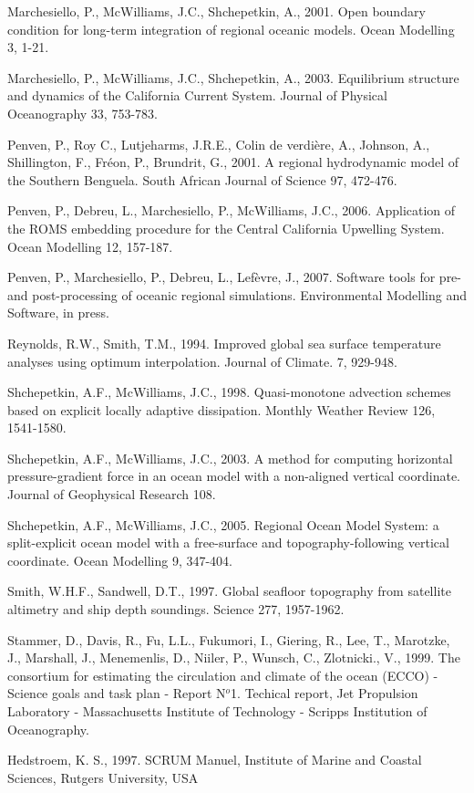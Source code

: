 Marchesiello, P., McWilliams, J.C., Shchepetkin, A.,
2001.
Open boundary condition for long-term integration of regional oceanic
models.
Ocean Modelling
3,
1-21.

Marchesiello, P., McWilliams, J.C., Shchepetkin, A.,
2003.
Equilibrium structure and dynamics of the California Current System.
Journal of Physical Oceanography
33,
753-783.

Penven, P., Roy C., Lutjeharms, J.R.E., 
Colin de verdi\`ere, A., Johnson, A., Shillington, F.,
Fr\'eon, P., Brundrit, G.,
2001.
A regional hydrodynamic model of the Southern Benguela.
South African Journal of Science
97,
472-476.

Penven, P., Debreu, L., Marchesiello,  P., McWilliams, J.C.,
2006.
Application of the ROMS embedding procedure for the Central 
California Upwelling System.
Ocean Modelling
12, 157-187.

Penven, P., Marchesiello, P., Debreu, L., Lef\`evre, J.,
2007.
Software tools for pre- and post-processing of oceanic regional 
simulations.
Environmental Modelling and Software,
in press.

Reynolds, R.W., Smith, T.M., 1994. 
Improved global sea surface temperature
analyses using optimum interpolation. 
Journal of Climate.
7, 929-948.

Shchepetkin, A.F., McWilliams, J.C.,
1998.
Quasi-monotone advection schemes based on explicit locally
adaptive dissipation.
Monthly Weather Review
126,
1541-1580.

Shchepetkin, A.F., McWilliams, J.C.,
2003.
A method for computing horizontal pressure-gradient force
in an ocean model with a non-aligned vertical coordinate.
Journal of Geophysical Research
108.

Shchepetkin, A.F., McWilliams, J.C.,
2005.
Regional Ocean Model System: a split-explicit ocean model with a
free-surface and topography-following vertical coordinate.
Ocean Modelling
9, 347-404.

Smith, W.H.F., Sandwell, D.T.,
1997.
Global seafloor topography from satellite altimetry and ship depth soundings.
Science
277,
1957-1962.

Stammer, D., Davis, R., Fu, L.L., Fukumori, I., Giering, R., Lee, T.,
Marotzke, J., Marshall, J., Menemenlis, D., Niiler, P., Wunsch, C.,
Zlotnicki., V., 1999. 
The consortium for estimating the circulation and
climate of the ocean ({ECCO}) - {Science goals} and task plan - {Report
N$^o$1}. 
Techical report, 
Jet Propulsion Laboratory - Massachusetts Institute of
 Technology - Scripps Institution of Oceanography.

Hedstroem, K. S., 1997.
SCRUM Manuel,
Institute of Marine and Coastal Sciences, Rutgers University, USA
